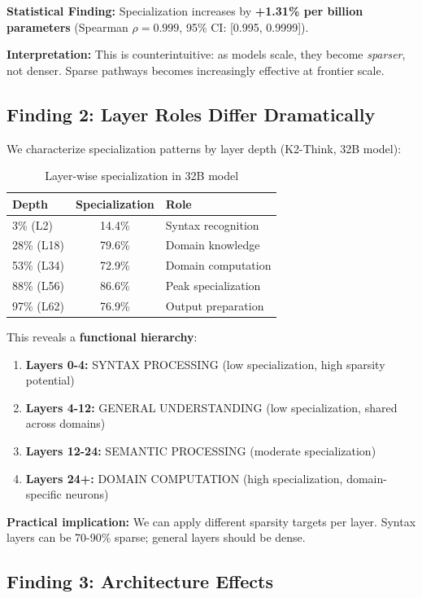 \documentclass{article}
\begin{document}
\textbf{Statistical Finding:} Specialization increases by \textbf{+1.31\% per billion parameters} (Spearman $\rho = 0.999$, 95\% CI: [0.995, 0.9999]).

\textbf{Interpretation:} This is counterintuitive: as models scale, they become \textit{sparser}, not denser. Sparse pathways becomes increasingly effective at frontier scale.

\subsection{Finding 2: Layer Roles Differ Dramatically}

We characterize specialization patterns by layer depth (K2-Think, 32B model):

\begin{table}[h]
\centering
\caption{Layer-wise specialization in 32B model}
\label{tab:layers}
\begin{tabular}{lcl}
\toprule
\textbf{Depth} & \textbf{Specialization} & \textbf{Role} \\
\midrule
3\% (L2) & 14.4\% & Syntax recognition \\
28\% (L18) & 79.6\% & Domain knowledge \\
53\% (L34) & 72.9\% & Domain computation \\
88\% (L56) & 86.6\% & Peak specialization \\
97\% (L62) & 76.9\% & Output preparation \\
\bottomrule
\end{tabular}
\end{table}

This reveals a \textbf{functional hierarchy}:
\begin{enumerate}
    \item \textbf{Layers 0-4:} SYNTAX PROCESSING (low specialization, high sparsity potential)
    \item \textbf{Layers 4-12:} GENERAL UNDERSTANDING (low specialization, shared across domains)
    \item \textbf{Layers 12-24:} SEMANTIC PROCESSING (moderate specialization)
    \item \textbf{Layers 24+:} DOMAIN COMPUTATION (high specialization, domain-specific neurons)
\end{enumerate}

\textbf{Practical implication:} We can apply different sparsity targets per layer. Syntax layers can be 70-90\% sparse; general layers should be dense.

\subsection{Finding 3: Architecture Effects}
\end{document}
